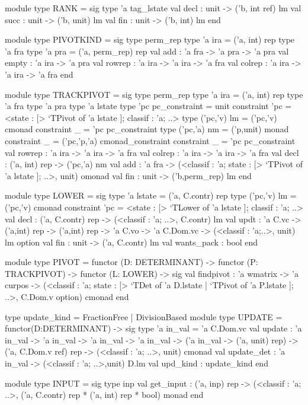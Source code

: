 \documentclass{elsart}
\begin{document}
\begin{code2}
module type RANK = sig
  type 'a tag_lstate
  val decl   : unit -> ('b, int ref) lm
  val succ   : unit -> ('b, unit) lm
  val fin    : unit -> ('b, int) lm
end

module type PIVOTKIND = sig
  type perm_rep
  type 'a ira = ('a, int) rep
  type 'a fra
  type 'a pra = ('a, perm_rep) rep
  val add    : 'a fra -> 'a pra -> 'a pra
  val empty  : 'a ira -> 'a pra
  val rowrep : 'a ira -> 'a ira -> 'a fra
  val colrep : 'a ira -> 'a ira -> 'a fra
end

module type TRACKPIVOT = sig
  type perm_rep
  type 'a ira = ('a, int) rep
  type 'a fra   type 'a pra   type 'a lstate
  type 'pc pc_constraint = unit
    constraint 'pc = <state : [> `TPivot of 'a lstate ]; classif : 'a; ..>
  type ('pc,'v) lm = ('pc,'v) cmonad constraint _  = 'pc pc_constraint
  type ('pc,'a) nm = ('p,unit) monad
    constraint _ = ('pc,'p,'a) cmonad_constraint
    constraint _ = 'pc pc_constraint
  val rowrep : 'a ira -> 'a ira -> 'a fra
  val colrep : 'a ira -> 'a ira -> 'a fra
  val decl   : ('a, int) rep -> ('pc,'a) nm
  val add : 'a fra -> (<classif : 'a; state : [> `TPivot of 'a lstate ]; ..>, unit) omonad
  val fin    : unit -> ('b,perm_rep) lm
end

module type LOWER = sig
  type 'a lstate = ('a, C.contr) rep
  type ('pc,'v) lm = ('pc,'v) cmonad
    constraint 'pc = <state : [> `TLower of 'a lstate ]; classif : 'a; ..>
  val decl   : ('a, C.contr) rep -> (<classif : 'a; ..>, C.contr) lm
  val updt   : 'a C.vc -> ('a,int) rep -> ('a,int) rep -> 'a C.vo -> 
            'a C.Dom.vc -> (<classif : 'a;..>, unit) lm option
  val fin    : unit -> ('a,  C.contr) lm
  val wants_pack : bool
end

module type PIVOT = functor (D: DETERMINANT) -> functor (P: TRACKPIVOT) -> 
          functor (L: LOWER) -> sig
 val findpivot : 'a wmatrix -> 'a curpos -> 
   (<classif : 'a;  state : [> `TDet of 'a D.lstate | `TPivot of 'a P.lstate ]; ..>, 
    C.Dom.v option) cmonad
end

type update_kind = FractionFree | DivisionBased
module type UPDATE = functor(D:DETERMINANT) -> sig
  type 'a in_val = 'a C.Dom.vc
  val update :  'a in_val -> 'a in_val -> 'a in_val -> 'a in_val -> 
      ('a in_val -> ('a, unit) rep) -> ('a, C.Dom.v ref) rep -> 
      (<classif : 'a; ..>, unit) cmonad
  val update_det : 'a in_val -> (<classif : 'a; ..>,unit) D.lm
  val upd_kind : update_kind
end

module type INPUT = sig
  type inp
  val get_input : ('a, inp) rep ->
         (<classif : 'a; ..>, ('a, C.contr) rep * ('a, int) rep * bool) monad
end 
\end{code2}
\end{document}
